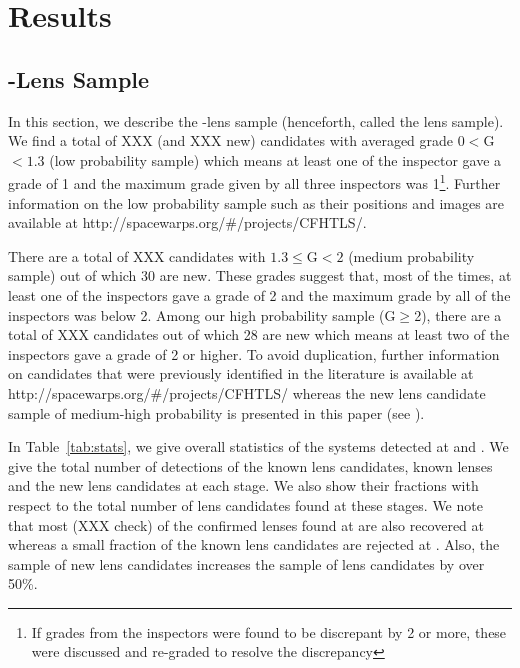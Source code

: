 \documentclass[useAMS,usenatbib,a4paper]{mn2e}
\begin{document}
\section{Results}
\label{sec:results}

\subsection{\sw-\cfhtls Lens Sample}
\label{sec:swlens}

In this section, we describe the \sw-\cfhtls lens sample (henceforth,
called the \sw lens sample). We find a total of XXX (and XXX new)
candidates with averaged grade $0<$G$<1.3$ (low probability sample)
which means at least one of the inspector gave a grade of 1 and the
maximum grade given by all three inspectors was 1\footnote{If grades
from the inspectors were found to be discrepant by 2 or more, these were
discussed and re-graded to resolve the discrepancy}. Further information
on the low probability sample such as their positions and images are
available at http://spacewarps.org/\#/projects/CFHTLS/. 

There are a total of XXX candidates with $1.3\le$G$<2$ (medium
probability sample) out of which 30 are new. These grades suggest that,
most of the times, at least one of the inspectors gave a grade of 2 and
the maximum grade by all of the inspectors was below 2. Among our high
probability sample (G$\ge$2), there are a total of XXX candidates out of
which 28 are new which means at least two of the inspectors gave a grade
of 2 or higher. To avoid duplication, further information on \sw
candidates that were previously identified in the literature is
available at http://spacewarps.org/\#/projects/CFHTLS/ whereas the new
lens candidate sample of medium-high probability is presented in this
paper (see ).

In Table~\ref{tab:stats}, we give overall statistics of the systems detected at
\StageOne and \StageTwo. We give the total number of detections of the known lens
candidates, known lenses and the new lens candidates at each stage.  We also
show their fractions with respect to the total number of lens candidates found
at these stages. We note that most (XXX check) of the confirmed lenses found at
\StageOne are also recovered at \StageTwo whereas a small fraction of the known
lens candidates are rejected at \StageTwo. Also, the sample of new lens
candidates increases the sample of \cfhtls lens candidates by over 50\%.
\end{document}
